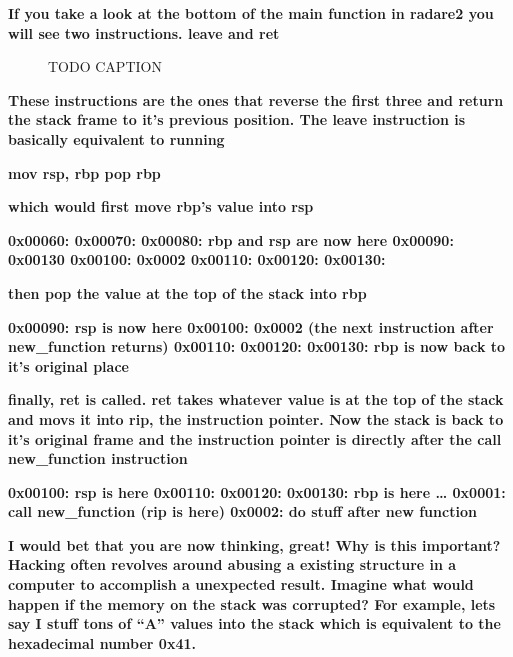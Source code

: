 \documentclass[letterpaper]{article}
\newcommand{\sitfig}[3]{
\begin{figure}[H]
\centering
\makebox[\textwidth][c]{
#2
}
\caption{#3}
\label{#1}
\end{figure}
}
\newcommand{\sitgfx}[4][scale=1.0]{
\sitfig{#3}{\texttt{[image: \#2]}}{#4}
}
\begin{document}
\textbf{If you take a look at the bottom of the main function in radare2 you will see two instructions. leave and ret}

  
\sitgfx[width=5.8335in,height=3.6457in]{FINALWORKINGDOCFORMERLYPRECURSOR-img089.png}{fig:unk}{TODO CAPTION}
 

\textbf{These instructions are the ones that reverse the first three and return the stack frame to it's previous
position. The leave instruction is basically equivalent to running}

\textbf{mov rsp, rbp\newline
pop rbp}

\textbf{which would first move rbp's value into rsp}

\textbf{0x00060:\newline
0x00070:\newline
0x00080: rbp and rsp are now here\newline
0x00090: 0x00130\newline
0x00100: 0x0002\newline
0x00110:\newline
0x00120:\newline
0x00130:}

\textbf{then pop the value at the top of the stack into rbp}

\textbf{0x00090: rsp is now here\newline
0x00100: 0x0002 (the next instruction after new\_function returns)\newline
0x00110:\newline
0x00120:\newline
0x00130: rbp is now back to it's original place}

\textbf{finally, ret is called. ret takes whatever value is at the top of the stack and movs it into rip, the
instruction pointer. Now the stack is back to it's original frame and the instruction pointer is directly after the
call new\_function instruction}

\textbf{0x00100: rsp is here\newline
0x00110:\newline
0x00120:\newline
0x00130: rbp is here\newline
{\dots}\newline
0x0001: call new\_function\newline
(rip is here)\newline
0x0002: do stuff after new function}

\textbf{I would bet that you are now thinking, great! Why is this important? Hacking often revolves around abusing a
existing structure in a computer to accomplish a unexpected result. Imagine what would happen if the memory on the
stack was corrupted? For example, lets say I stuff tons of ``A'' values into the stack which is equivalent to the
hexadecimal number 0x41.}
\end{document}

